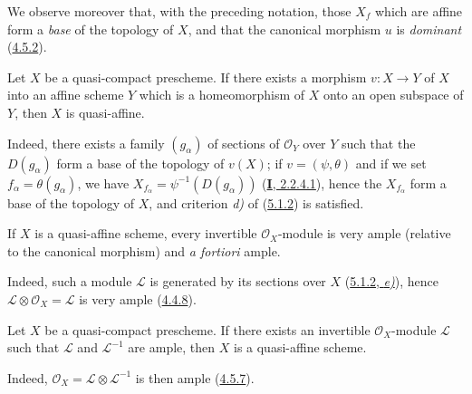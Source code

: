 We observe moreover that, with the preceding notation, those $X_f$ which
are affine form a \emph{base} of the topology of $X$, and that the
canonical morphism $u$ is \emph{dominant}
(\hyperref[II.4.5.2]{4.5.2}).

\begin{corollary}[5.1.3]
\label{II.5.1.3}
Let $X$ be a quasi-compact prescheme. If there exists a morphism $v:X\to Y$ of
$X$ into an affine scheme $Y$ which is a homeomorphism of $X$ onto an
open subspace of $Y$, then $X$ is quasi-affine.
\end{corollary}

Indeed, there exists a family $(g_\alpha)$ of sections of $\mathcal{O}_Y$
over $Y$ such that the $D(g_\alpha)$ form a base of the
topology of $v(X)$; if $v=(\psi,\theta)$ and if we set
$f_\alpha=\theta(g_\alpha)$, we have
$X_{f_\alpha}=\psi^{-1}(D(g_\alpha))$
(\hyperref[I.2.2.4.1]{\textbf{I}, 2.2.4.1}), hence the $X_{f_\alpha}$ form a
base of the topology of $X$, and criterion \emph{d)} of
(\hyperref[II.5.1.2]{5.1.2}) is satisfied.

\begin{corollary}[5.1.4]
\label{II.5.1.4}
If $X$ is a quasi-affine scheme, \textup{every} invertible $\mathcal{O}_X$-module is
very ample (relative to the canonical morphism) and \emph{a fortiori} ample.
\end{corollary}

Indeed, such a module $\mathcal{L}$ is generated by its sections over
$X$ (\hyperref[II.5.1.2]{5.1.2, \emph{e)}}), hence
$\mathcal{L}\otimes\mathcal{O}_X=\mathcal{L}$ is very ample
(\hyperref[II.4.4.8]{4.4.8}).

\begin{corollary}[5.1.5]
\label{II.5.1.5}
Let $X$ be a quasi-compact prescheme. If there exists an invertible
$\mathcal{O}_X$-module $\mathcal{L}$ such that $\mathcal{L}$ and
$\mathcal{L}^{-1}$ are ample, then $X$ is a quasi-affine scheme.
\end{corollary}

Indeed, $\mathcal{O}_X=\mathcal{L}\otimes\mathcal{L}^{-1}$ is then ample
(\hyperref[II.4.5.7]{4.5.7}).

